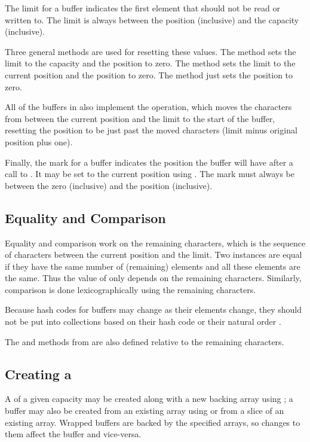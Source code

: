 The limit for a buffer indicates the first element that should not be
read or written to.  The limit is always between the position (inclusive)
and the capacity (inclusive).

Three general methods are used for resetting these values.  The
 method sets the limit to the capacity and the position
to zero.  The  method sets the limit to the current
position and the position to zero.  The  method just
sets the position to zero.  

All of the buffers in  also implement the
 operation, which moves the characters from between
the current position and the limit to the start of the buffer,
resetting the position to be just past the moved characters (limit
minus original position plus one).

Finally, the mark for a buffer indicates the position the buffer will
have after a call to .  It may be set to the current
position using .  The mark must always be between the
zero (inclusive) and the position (inclusive).

\subsection{Equality and Comparison}

Equality and comparison work on the remaining characters, which is the
sequence of characters between the current position and the limit.
Two  instances are equal if they have the same number
of (remaining) elements and all these elements are the same.  Thus the
value of  only depends on the remaining characters.
Similarly, comparison is done lexicographically using the remaining
characters.

Because hash codes for buffers may change as their elements change,
they should not be put into collections based on their hash code
 or their natural order
.

The  and  methods from 
are also defined relative to the remaining characters.


\subsection{Creating a }

A  of a given capacity may be created along with
a new backing array using
; a buffer may also be created from
an existing array using  or from a slice
of an existing array.  Wrapped buffers are backed by the specified
arrays, so changes to them affect the buffer and vice-versa.

